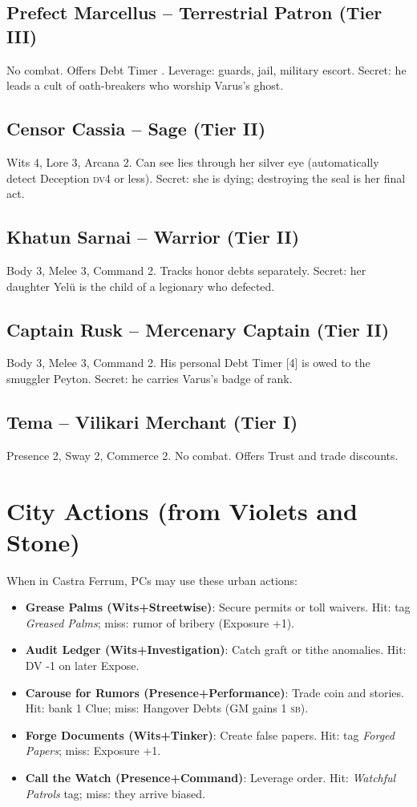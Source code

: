\documentclass[10pt,twoside]{book}
\newcommand{\sb}{\textsc{sb}}
\newcommand{\dv}{\textsc{dv}}
\begin{document}
\subsection{Prefect Marcellus -- Terrestrial Patron (Tier III)}
No combat. Offers Debt Timer . Leverage: guards, jail, military escort. Secret: he leads a cult of oath-breakers who worship Varus's ghost.

\subsection{Censor Cassia -- Sage (Tier II)}
Wits 4, Lore 3, Arcana 2. Can see lies through her silver eye (automatically detect Deception \dv 4 or less). Secret: she is dying; destroying the seal is her final act.

\subsection{Khatun Sarnai -- Warrior (Tier II)}
Body 3, Melee 3, Command 2. Tracks honor debts separately. Secret: her daughter Yelü is the child of a legionary who defected.

\subsection{Captain Rusk -- Mercenary Captain (Tier II)}
Body 3, Melee 3, Command 2. His personal Debt Timer [4] is owed to the smuggler Peyton. Secret: he carries Varus's badge of rank.

\subsection{Tema -- Vilikari Merchant (Tier I)}
Presence 2, Sway 2, Commerce 2. No combat. Offers Trust and trade discounts.

\section{City Actions (from Violets and Stone)}

When in Castra Ferrum, PCs may use these urban actions:

\begin{itemize}
\item \textbf{Grease Palms (Wits+Streetwise)}: Secure permits or toll waivers. Hit: tag \textit{Greased Palms}; miss: rumor of bribery (Exposure +1).
\item \textbf{Audit Ledger (Wits+Investigation)}: Catch graft or tithe anomalies. Hit: DV -1 on later Expose.
\item \textbf{Carouse for Rumors (Presence+Performance)}: Trade coin and stories. Hit: bank 1 Clue; miss: Hangover Debts (GM gains 1 \sb).
\item \textbf{Forge Documents (Wits+Tinker)}: Create false papers. Hit: tag \textit{Forged Papers}; miss: Exposure +1.
\item \textbf{Call the Watch (Presence+Command)}: Leverage order. Hit: \textit{Watchful Patrols} tag; miss: they arrive biased.
\end{itemize}
\end{document}
